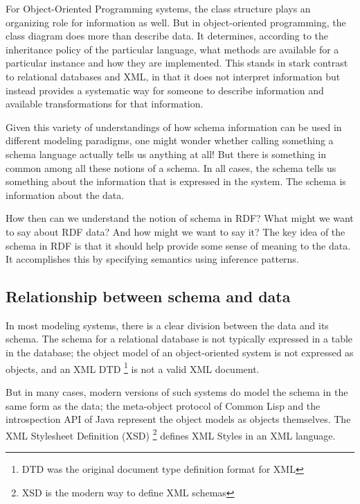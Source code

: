 For Object-Oriented Programming systems, the class structure plays an
organizing role for information as well. But in object-oriented
programming, the class diagram does more than describe data. It
determines, according to the inheritance policy of the particular
language, what methods are available for a particular instance and how
they are implemented. This stands in stark contrast to relational
databases and XML, in that it does not interpret information but instead
provides a systematic way for someone to describe information and
available transformations for that information.

Given this variety of understandings of how schema information can be
used in different modeling paradigms, one might wonder whether calling
something a schema language actually tells us anything at all! But there
is something in common among all these notions of a schema. In all
cases, the schema tells us something about the information that is
expressed in the system. The schema is information about the data.

How then can we understand the notion of schema in RDF? What might we
want to say about RDF data? And how might we want to say it? The key
idea of the schema in RDF is that it should help provide some sense of
meaning to the data. It accomplishes this by specifying semantics using
inference patterns.

\subsection{Relationship between schema and data}

In most modeling systems, there is a clear division between the data and
its schema. The schema for a relational database is not typically
expressed in a table in the database; the object model of an
object-oriented system is not expressed as objects, and an XML DTD \footnote{DTD was the original document type definition format for XML} is
not a valid XML document.

But in many cases, modern versions of such systems do model the schema
in the same form as the data; the meta-object protocol of Common Lisp
and the introspection API of Java represent the object models as objects
themselves. The XML Stylesheet Definition (XSD) \footnote {XSD is the modern way to define XML schemas} defines XML Styles in an XML
language.

